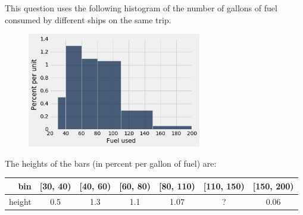 \question This question uses the following histogram of the number of gallons
of fuel consumed by different ships on the same trip.

\begin{figure}[h!]
  \centering
  \includegraphics[height=5cm]{figs/fuel_bins.png}
  \label{fig:fuelbins}
\end{figure}

The heights of the bars (in percent per gallon of fuel) are:

\begin{center}
\begin{tabular}{ r || c | c | c | c | c | c }
 bin & [30, 40) & [40, 60) & [60, 80)
    & [80, 110) & [110, 150) & [150, 200) \\
 \hline
 height & 0.5 & 1.3 & 1.1 & 1.07 & ? & 0.06 \\
\end{tabular}
\end{center}

